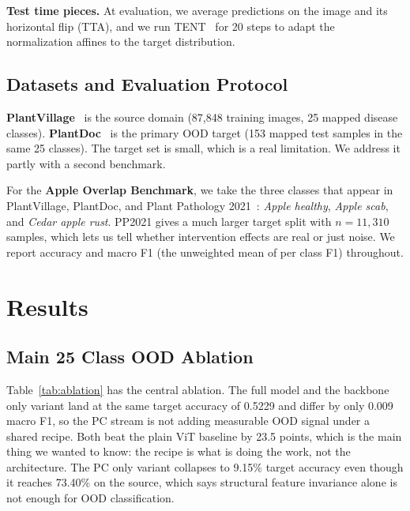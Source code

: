 \documentclass[conference]{IEEEtran}
\begin{document}
\textbf{Test time pieces.} At evaluation, we average predictions on the image and its horizontal flip (TTA), and we run TENT~\cite{Wang2021} for 20 steps to adapt the normalization affines to the target distribution.

\subsection{Datasets and Evaluation Protocol}

\textbf{PlantVillage}~\cite{Hughes2015} is the source domain (87,848 training images, 25 mapped disease classes). \textbf{PlantDoc}~\cite{Singh2020} is the primary OOD target (153 mapped test samples in the same 25 classes). The target set is small, which is a real limitation. We address it partly with a second benchmark.

For the \textbf{Apple Overlap Benchmark}, we take the three classes that appear in PlantVillage, PlantDoc, and Plant Pathology 2021~\cite{Thapa2020}: \textit{Apple healthy}, \textit{Apple scab}, and \textit{Cedar apple rust}. PP2021 gives a much larger target split with $n{=}11{,}310$ samples, which lets us tell whether intervention effects are real or just noise. We report accuracy and macro F1 (the unweighted mean of per class F1) throughout.

\section{Results}
\label{sec:results}

\subsection{Main 25 Class OOD Ablation}

Table~\ref{tab:ablation} has the central ablation. The full model and the backbone only variant land at the same target accuracy of 0.5229 and differ by only 0.009 macro F1, so the PC stream is not adding measurable OOD signal under a shared recipe. Both beat the plain ViT baseline by 23.5 points, which is the main thing we wanted to know: the recipe is what is doing the work, not the architecture. The PC only variant collapses to 9.15\% target accuracy even though it reaches 73.40\% on the source, which says structural feature invariance alone is not enough for OOD classification.
\end{document}
